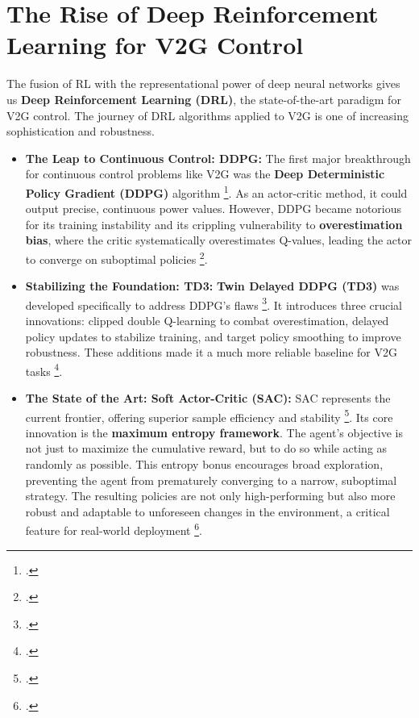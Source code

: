 

\section{The Rise of Deep Reinforcement Learning for V2G Control}
The fusion of RL with the representational power of deep neural networks gives us \textbf{Deep Reinforcement Learning (DRL)}, the state-of-the-art paradigm for V2G control. The journey of DRL algorithms applied to V2G is one of increasing sophistication and robustness.

\begin{itemize}
    \item \textbf{The Leap to Continuous Control: DDPG:} The first major breakthrough for continuous control problems like V2G was the \textbf{Deep Deterministic Policy Gradient (DDPG)} algorithm \footcite{lillicrap2015continuous}. As an actor-critic method, it could output precise, continuous power values. However, DDPG became notorious for its training instability and its crippling vulnerability to \textbf{overestimation bias}, where the critic systematically overestimates Q-values, leading the actor to converge on suboptimal policies \footcite{orfanoudakis2022deep, alfaverh2022optimal}.

    \item \textbf{Stabilizing the Foundation: TD3:} \textbf{Twin Delayed DDPG (TD3)} was developed specifically to address DDPG's flaws \footcite{fujimoto2018addressing}. It introduces three crucial innovations: clipped double Q-learning to combat overestimation, delayed policy updates to stabilize training, and target policy smoothing to improve robustness. These additions made it a much more reliable baseline for V2G tasks \footcite{liu2023optimal, wang2022multi}.

    \item \textbf{The State of the Art: Soft Actor-Critic (SAC):} SAC represents the current frontier, offering superior sample efficiency and stability \footcite{haarnoja2018soft}. Its core innovation is the \textbf{maximum entropy framework}. The agent's objective is not just to maximize the cumulative reward, but to do so while acting as randomly as possible. This entropy bonus encourages broad exploration, preventing the agent from prematurely converging to a narrow, suboptimal strategy. The resulting policies are not only high-performing but also more robust and adaptable to unforeseen changes in the environment, a critical feature for real-world deployment \footcite{logeshwaran2022comparative}.
\end{itemize}

